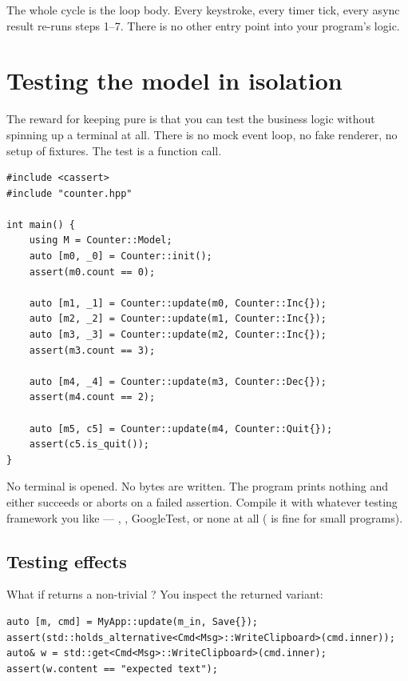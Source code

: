 The whole cycle is the loop body. Every keystroke, every timer tick,
every async result re-runs steps 1--7. There is no other entry
point into your program's logic.

\section{Testing the model in isolation}
\label{sec:elm:tests}

The reward for keeping  pure is that you can test the
business logic without spinning up a terminal at all. There is no
mock event loop, no fake renderer, no setup of fixtures. The test is
a function call.

\begin{lstlisting}
#include <cassert>
#include "counter.hpp"

int main() {
    using M = Counter::Model;
    auto [m0, _0] = Counter::init();
    assert(m0.count == 0);

    auto [m1, _1] = Counter::update(m0, Counter::Inc{});
    auto [m2, _2] = Counter::update(m1, Counter::Inc{});
    auto [m3, _3] = Counter::update(m2, Counter::Inc{});
    assert(m3.count == 3);

    auto [m4, _4] = Counter::update(m3, Counter::Dec{});
    assert(m4.count == 2);

    auto [m5, c5] = Counter::update(m4, Counter::Quit{});
    assert(c5.is_quit());
}
\end{lstlisting}

No terminal is opened. No bytes are written. The program prints
nothing and either succeeds or aborts on a failed assertion. Compile
it with whatever \cpp{} testing framework you like ---
, , GoogleTest, or none at all
( is fine for small programs).

\subsection{Testing effects}

What if  returns a non-trivial ? You inspect
the returned variant:

\begin{lstlisting}
auto [m, cmd] = MyApp::update(m_in, Save{});
assert(std::holds_alternative<Cmd<Msg>::WriteClipboard>(cmd.inner));
auto& w = std::get<Cmd<Msg>::WriteClipboard>(cmd.inner);
assert(w.content == "expected text");
\end{lstlisting}

